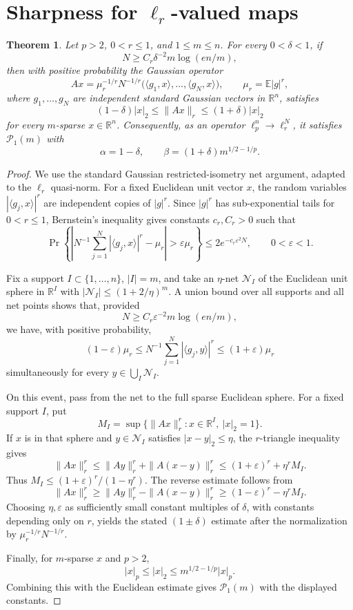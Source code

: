 \documentclass[11pt]{article}
\newtheorem{theorem}{Theorem}
\newcommand{\R}{\mathbb R}
\newcommand{\E}{\mathbb E}
\begin{document}
\section{Sharpness for \texorpdfstring{\(\ell_r\)}{ell-r}-valued maps}

\begin{theorem}\label{thm:upper}
Let \(p>2\), \(0<r\le1\), and \(1\le m\le n\).  For every
\(0<\delta<1\), if
\[
  N\ge C_r\delta^{-2}m\log(en/m),
\]
then with positive probability the Gaussian operator
\[
  A x=\mu_r^{-1/r}N^{-1/r}\big(\langle g_1,x\rangle,\ldots,
  \langle g_N,x\rangle\big),\qquad
  \mu_r=\E |g|^r,
\]
where \(g_1,\ldots,g_N\) are independent standard Gaussian vectors in
\(\R^n\), satisfies
\[
  (1-\delta)|x|_2\le \|Ax\|_r\le(1+\delta)|x|_2
\]
for every \(m\)-sparse \(x\in\R^n\).  Consequently, as an operator
\(\ell_p^n\to\ell_r^N\), it satisfies \(\mathcal P_1(m)\) with
\[
  \alpha=1-\delta,\qquad
  \beta=(1+\delta)m^{1/2-1/p}.
\]
\end{theorem}

\begin{proof}
We use the standard Gaussian restricted-isometry net argument, adapted to the
\(\ell_r\) quasi-norm.  For a fixed Euclidean unit vector \(x\), the random
variables \(|\langle g_j,x\rangle|^r\) are independent copies of \(|g|^r\).
Since \(|g|^r\) has sub-exponential tails for \(0<r\le1\), Bernstein's
inequality gives constants \(c_r,C_r>0\) such that
\[
 \Pr\left\{\left|N^{-1}\sum_{j=1}^N|\langle g_j,x\rangle|^r-\mu_r\right|
       >\varepsilon\mu_r\right\}
 \le 2e^{-c_r\varepsilon^2N},\qquad 0<\varepsilon<1.
\]

Fix a support \(I\subset\{1,\ldots,n\}\), \(|I|=m\), and take an
\(\eta\)-net \(\mathcal N_I\) of the Euclidean unit sphere in \(\R^I\) with
\(|\mathcal N_I|\le (1+2/\eta)^m\).  A union bound over all supports and all
net points shows that, provided
\[
 N\ge C_r\varepsilon^{-2}m\log(en/m),
\]
we have, with positive probability,
\[
  (1-\varepsilon)\mu_r
  \le N^{-1}\sum_{j=1}^N|\langle g_j,y\rangle|^r
  \le (1+\varepsilon)\mu_r
\]
simultaneously for every \(y\in\bigcup_I\mathcal N_I\).

On this event, pass from the net to the full sparse Euclidean sphere.  For a
fixed support \(I\), put
\[
  M_I=\sup\{\|Ax\|_r^r: x\in\R^I,\ |x|_2=1\}.
\]
If \(x\) is in that sphere and \(y\in\mathcal N_I\) satisfies
\(|x-y|_2\le\eta\), the \(r\)-triangle inequality gives
\[
  \|Ax\|_r^r\le \|Ay\|_r^r+\|A(x-y)\|_r^r
  \le (1+\varepsilon)^r+\eta^r M_I.
\]
Thus \(M_I\le (1+\varepsilon)^r/(1-\eta^r)\).  The reverse estimate follows
from
\[
  \|Ax\|_r^r\ge \|Ay\|_r^r-\|A(x-y)\|_r^r
  \ge (1-\varepsilon)^r-\eta^r M_I.
\]
Choosing \(\eta,\varepsilon\) as sufficiently small constant multiples of
\(\delta\), with constants depending only on \(r\), yields the stated
\((1\pm\delta)\) estimate after the normalization by \(\mu_r^{-1/r}N^{-1/r}\).

Finally, for \(m\)-sparse \(x\) and \(p>2\),
\[
  |x|_p\le |x|_2\le m^{1/2-1/p}|x|_p.
\]
Combining this with the Euclidean estimate gives \(\mathcal P_1(m)\) with the
displayed constants.
\end{proof}
\end{document}
